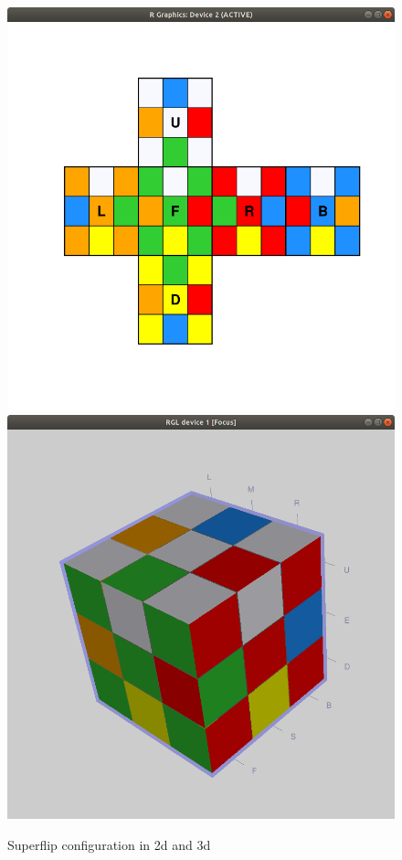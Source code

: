 \documentclass{article}
\begin{document}
\begin{figure}
	\centering
	\includegraphics[scale=.37]{superflip.png}
    \includegraphics[scale=.37]{superflip3d.png}
    \caption{Superflip configuration in 2d and 3d}
\end{figure}
\end{document}
